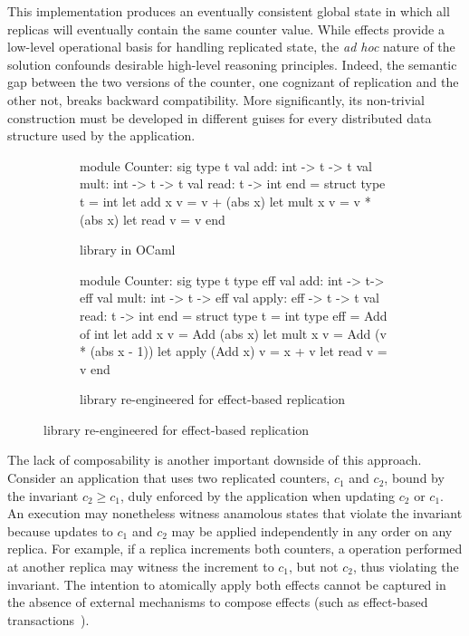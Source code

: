 This implementation produces an eventually consistent global state in
which all replicas will eventually contain the same counter value.
While effects provide a low-level operational basis for handling
replicated state, the \emph{ad hoc} nature of the solution confounds
desirable high-level reasoning principles.  Indeed, the semantic gap
between the two versions of the counter, one cognizant of replication
and the other not, breaks backward compatibility.  More significantly,
its non-trivial construction must be developed in different guises for
every distributed data structure used by the application.
\begin{figure}
\begin{subfigure}[b]{0.4\textwidth}
  \begin{ocaml}
    module Counter: sig
      type t
      val add: int -> t -> t
      val mult: int -> t -> t
      val read: t -> int
    end = struct
      type t = int
      let add x v = v + (abs x)
      let mult x v = v * (abs x)
      let read v = v
    end
  \end{ocaml}
\caption{ library in OCaml}
\label{fig:counter-adt}
\end{subfigure}
\begin{subfigure}[b]{0.56\textwidth}
  \begin{ocaml}
    module Counter: sig
      type t
      type eff 
      val add: int -> t-> eff
      val mult: int -> t -> eff
      val apply: eff -> t -> t
      val read: t -> int
    end = struct
      type t = int
      type eff = Add of int
      let add x v = Add (abs x)
      let mult x v = Add (v * (abs x - 1))
      let apply (Add x) v = x + v
      let read v = v
    end
  \end{ocaml}
\caption{ library re-engineered for effect-based replication}
\label{fig:counter-rdt}
\end{subfigure}
\end{figure}
The lack of composability is another important downside of this
approach.  Consider an application that uses two replicated counters,
$c_1$ and $c_2$, bound by the invariant $c_2 \ge c_1$, duly enforced
by the application when updating $c_2$ or $c_1$.  An execution may
nonetheless witness anamolous states that violate the invariant
because updates to $c_1$ and $c_2$ may be applied independently in any
order on any replica.  For example, if a replica increments both
counters, a  operation performed at another replica may
witness the increment to $c_1$, but not $c_2$, thus violating the
invariant. The intention to atomically apply both effects cannot be
captured in the absence of external mechanisms to compose effects
(such as effect-based transactions~\cite{pldi15}).

